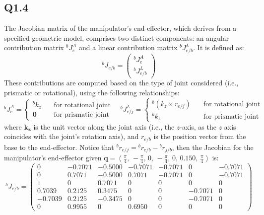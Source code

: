 \subsection{Q1.4}
The Jacobian matrix of the manipulator’s end-effector, which derives from a specified geometric model, comprises two distinct components: an angular contribution matrix $^b J^A_{e}$ and a linear contribution matrix $^b J^L_{e/b}$.
It is defined as:
\begin{equation}
	\renewcommand{\arraystretch}{1.5}
	^b J_{e/b} = \begin{pmatrix}
		^b J^A_{e} \\ 
		^b J^L_{e/b}
	\end{pmatrix}
\end{equation}
	These contributions are computed based on the type of joint considered (i.e., prismatic or rotational), using the following relationships:
	\begin{equation}
		^bJ_{e}^A =
		\begin{cases}
			{}^b k_{z} \quad &\text{for rotational joint}\\
			\mathbf{0} \quad &\text{for prismatic joint}
		\end{cases} \quad
		{}^bJ_{e/j}^L =
		\begin{cases}
			{}^b (k_{z} \times r_{e/j})  \quad &\text{for rotational joint}\\
			{}^b k_{z} \quad &\text{for prismatic joint}
		\end{cases}
	\end{equation}
where $\mathbf{k_{z}}$ is the unit vector along the joint axis (i.e., the $z$-axis, as the $z$ axis coincides with the joint's rotation axis), and $r_{e/b}$ is the position vector from the base to the end-effector. Notice that ${}^b r_{e/j} = {}^b r_{e/b} - {}^b r_{j/b}$, then the Jacobian for the manipulator’s end-effector given $\mathbf{q} = (\frac{\pi}{4},\,-\frac{\pi}{4},\,0,\,-\frac{\pi}{4},\,0,\,0.150,\,\frac{\pi}{4})$ is:
\begin{equation*} 
	^b J_{e/b} = \begin{pmatrix}
		0 & -0.7071 & -0.5000 & -0.7071 & -0.7071 & 0 & -0.7071 \\
		0 & 0.7071 & -0.5000 & 0.7071 & -0.7071 & 0 & -0.7071 \\
		1 & 0 & 0.7071 & 0 & 0 & 0 & 0 \\
		0.7039 & 0.2125 & 0.3475 & 0 & 0 & -0.7071 & 0 \\
		-0.7039 & 0.2125 & -0.3475 & 0 & 0 & -0.7071 & 0 \\
		0 & 0.9955 & 0 & 0.6950 & 0 & 0 & 0
	\end{pmatrix}
\end{equation*}

